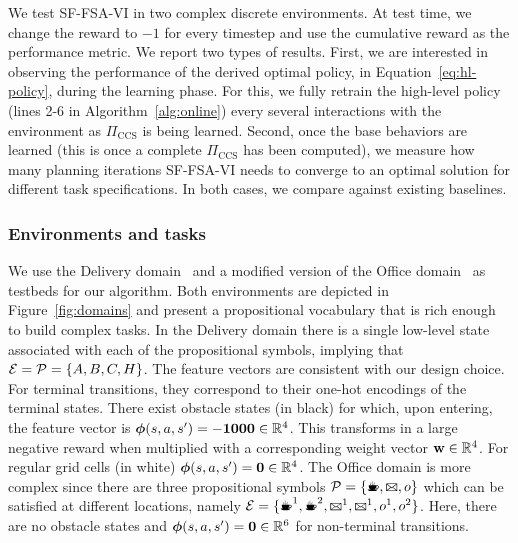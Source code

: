 We test SF-FSA-VI in two complex discrete environments. At test time, we change the reward to $-1$ for every timestep and use the cumulative reward as the performance metric. We report two types of results. First, we are interested in observing the performance of the derived optimal policy, in Equation~\eqref{eq:hl-policy}, during the learning phase. For this, we fully retrain the high-level policy (lines 2-6 in Algorithm~\ref{alg:online}) every several interactions with the environment as $\Pi_\text{CCS}$ is being learned. Second, once the base behaviors are learned (this is once a complete $\Pi_\text{CCS}$ has been computed), we measure how many planning iterations SF-FSA-VI needs to converge to an optimal solution for different task specifications. In both cases, we compare against existing baselines.

\subsubsection{Environments and tasks} We use the Delivery domain~\citep{Araki2021} and a modified version of the Office domain~\citep{Icarte2022} as testbeds for our algorithm. Both environments are depicted in Figure~\ref{fig:domains} and present a propositional vocabulary that is rich enough to build complex tasks. In the Delivery domain there is a single low-level state associated with each of the propositional symbols, implying that ${\mathcal{E}=\mathcal{P}=\{A,B,C, H\}}$. The feature vectors are consistent with our design choice. For terminal transitions, they correspond to their one-hot encodings of the terminal states. There exist obstacle states (in black) for which, upon entering,  the feature vector is $\boldsymbol{\phi}(s,a,s')=\mathbf{-1000}\in\mathbb{R}^4$. This transforms in a large negative reward when multiplied with a corresponding weight vector $\mathbf{w}\in\mathbb{R}^{4}$. For regular grid cells (in white) $\boldsymbol{\phi}(s,a,s')=\mathbf{0}\in\mathbb{R}^{4}$. The Office domain is more complex since there are three propositional symbols $\cP=\{\text{\coffee}, \text{\mail}, o\}$ which can be satisfied at different locations, namely $\cE=\{\text{\coffee}^1, \text{\coffee}^2, \text{\mail}^1, \text{\mail}^1, o^1, o^2\}$. Here, there are no obstacle states and $\boldsymbol{\phi}(s,a,s')=\mathbf{0}\in\mathbb{R}^6$ for non-terminal transitions.

